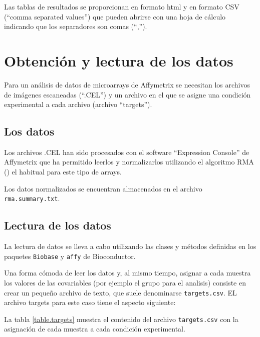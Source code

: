 \documentclass[a4paper]{article}\usepackage[]{graphicx}\usepackage[]{color}
\newcommand{\Rcode}[1]{{\texttt{#1}}}
\begin{document}
Las tablas de resultados se proporcionan en formato html y en formato
CSV (``comma separated values'') que pueden abrirse con una hoja de
cálculo indicando que los separadores son comas (``,'').










\section{Obtención y lectura de los datos}

Para un análisis de datos de microarrays de Affymetrix se necesitan los archivos 
de imágenes escaneadas (``.CEL'') y un archivo en el que se asigne una condición 
experimental a cada archivo (archivo ``targets'').

\subsection{Los datos}

Los archivos .CEL han sido procesados con el software ``Expression
Console'' de Affymetrix que ha permitido leerlos y normalizarlos
utilizando el algoritmo RMA (\cite{Irizarry2003}) el habitual para este tipo de arrays.

Los datos normalizados se encuentran almacenados en el archivo
\texttt{rma.summary.txt}.

\subsection{Lectura de los datos}

La lectura de datos se lleva a cabo utilizando las clases y métodos
definidas en los paquetes \Rcode{Biobase} y \Rcode{affy} de
Bioconductor.

Una forma cómoda de leer los datos y, al mismo tiempo, asignar a cada
muestra los valores de las covariables (por ejemplo el grupo para el
analisis) consiste en crear un pequeño archivo de texto, que suele
denominarse \Rcode{targets.csv}. EL archivo targets para este caso
tiene el aspecto siguiente:

La tabla \ref{table.targets} muestra el contenido del archivo \texttt{targets.csv}
con la asignación de cada muestra a cada condición experimental.
\end{document}
